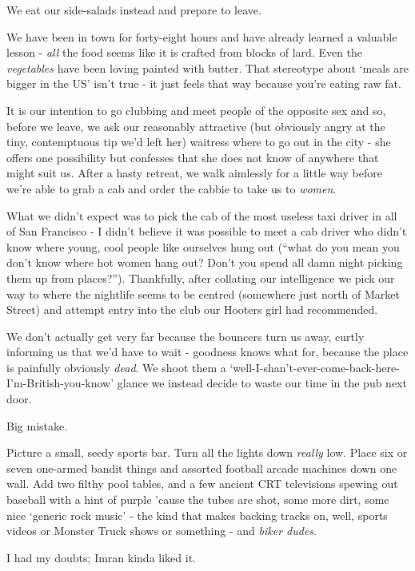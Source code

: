 \documentclass[a5paper,titlepage,11pt]{book}
\begin{document}
We eat our side-salads instead and prepare to leave.

We have been in town for forty-eight hours and have already learned a valuable lesson - \emph{all} the food seems like it is crafted from blocks of lard.  Even the \emph{vegetables} have been loving painted with butter.  That stereotype about `meals are bigger in the US' isn't true - it just feels that way because you're eating raw fat.

It is our intention to go clubbing and meet people of the opposite sex and so, before we leave, we ask our reasonably attractive (but obviously angry at the tiny, contemptuous tip we'd left her) waitress where to go out in the city - she offers one possibility but confesses that she does not know of anywhere that might suit us.  After a hasty retreat, we walk aimlessly for a little way before we're able to grab a cab and order the cabbie to take us to \emph{women}.

What we didn't expect was to pick the cab of the most useless taxi driver in all of San Francisco - I didn't believe it was possible to meet a cab driver who didn't know where young, cool people like ourselves hung out (``what do you mean you don't know where hot women hang out?  Don't you spend all damn night picking them up from places?'').  Thankfully, after collating our intelligence we pick our way to where the nightlife seems to be centred (somewhere just north of Market Street) and attempt entry into the club our Hooters girl had recommended.

We don't actually get very far because the bouncers turn us away, curtly informing us that we'd have to wait - goodness knows what for, because the place is painfully obviously \emph{dead}.  We shoot them a `well-I-shan't-ever-come-back-here-I'm-British-you-know' glance we instead decide to waste our time in the pub next door.

Big mistake.

Picture a small, seedy sports bar.  Turn all the lights down \emph{really} low.  Place six or seven one-armed bandit things and assorted football arcade machines down one wall.  Add two filthy pool tables, and a few ancient CRT televisions spewing out baseball with a hint of purple 'cause the tubes are shot, some more dirt, some nice `generic rock music' - the kind that makes backing tracks on, well, sports videos or Monster Truck shows or something - and \emph{biker dudes}.

I had my doubts; Imran kinda liked it.
\end{document}
